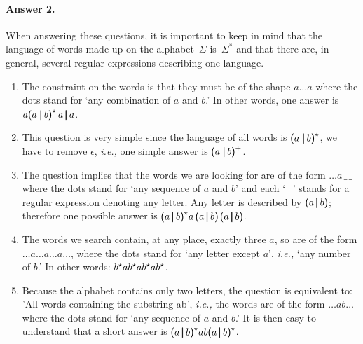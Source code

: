 \paragraph{Answer 2.}

When answering these questions, it is important to keep in mind that
the language of words made up on the alphabet~\(\Sigma\)
is~\(\Sigma^{*}\) and that there are, in general, several regular
expressions describing one language.

\begin{enumerate}

  \item The constraint on the words is that they must be of the shape
    \(a \ldots a\) where the dots stand for `any combination of \(a\)
    and \(b\).' In other words, one answer is \(a \textsf{(} a \;
    \pmb{\lvert}{} \, b\textsf{)}^{\star} \, a \, \pmb{\lvert} \, a\).

  \item This question is very simple since the language of all words
    is \(\textsf{(} a \; \pmb{\lvert}{} \, b\textsf{)}^{\star}\), we have to
    remove \(\epsilon\), \emph{i.e.,} one simple answer is \(\textsf{(} a \;
    \pmb{\lvert}{} \, b\textsf{)}^{+}\).

  \item The question implies that the words we are looking for are of
    the form \(\ldots a \, \_ \, \_\) where the dots stand for `any
    sequence of \(a\) and \(b\)' and each `\_' stands for a regular
    expression denoting any letter. Any letter is described
    by \(\textsf{(} a \, \pmb{\lvert}{} \, b\textsf{)}\); therefore one possible
    answer is \(\textsf{(} a \, \pmb{\lvert}{} \, b\textsf{)}^{\star}{}
    a \, \textsf{(} a \, \pmb{\lvert}{} \, b\textsf{)} \, \textsf{(} a \, \pmb{\lvert}{} \,
    b\textsf{)}\).

  \item The words we search contain, at any place, exactly three
    \(a\), so are of the form \(\ldots a \ldots a \ldots a \ldots\),
    where the dots stand for `any letter except \(a\)', \emph{i.e.,} `any
    number of \(b\).' In other words: \(b^{\star} a b^{\star} a
    b^{\star} a b^{\star}\).

  \item Because the alphabet contains only two letters, the question
    is equivalent to: 'All words containing the substring
    ab', \emph{i.e.,} the words are of the form \(\ldots ab \ldots\)
    where the dots stand for `any sequence of \(a\) and \(b\).' It is
    then easy to understand that a short answer is \(\textsf{(}
    a \, \pmb{\lvert}{} \, b\textsf{)}^{\star} ab \textsf{(} a \, \pmb{\lvert}{} \,
    b\textsf{)}^{\star}\).


\end{enumerate}
